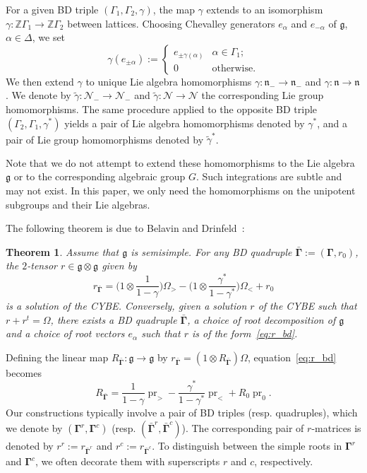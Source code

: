 \documentclass[11pt]{article}
\newcommand{\bbg}{\bar{\mathbf{\Gamma}}}
\newcommand{\bg}{\mathbf{\Gamma}}
\DeclareMathOperator{\pr}{pr}
\newtheorem{theorem}{Theorem}[section]
\theoremstyle{definition}\newtheorem{definition}[theorem]{Definition}
\theoremstyle{definition}\newtheorem{remark}[theorem]{Remark}
\theoremstyle{remark}
\numberwithin{equation}{section}
\begin{document}
For a given BD triple $(\Gamma_1,\Gamma_2,\gamma)$, the map $\gamma$ extends to an isomorphism $\gamma : \mathbb{Z}\Gamma_1 \rightarrow \mathbb{Z}\Gamma_2$  between lattices. Choosing Chevalley generators $e_{\alpha}$ and $e_{-\alpha}$ of $\mathfrak{g}$, $\alpha \in \Delta$, we set
\begin{equation*}
    \gamma(e_{\pm \alpha}) := \begin{cases}
        e_{\pm \gamma(\alpha)} & \alpha \in \Gamma_1;\\
        0 &\text{otherwise.}
    \end{cases}
\end{equation*}
We then extend $\gamma$ to unique Lie algebra homomorphisms $\gamma : \mathfrak{n}_-\rightarrow \mathfrak{n}_-$ and $\gamma : \mathfrak{n}\rightarrow \mathfrak{n}$. We denote by $\tilde{\gamma}: \mathcal{N}_- \rightarrow \mathcal{N}_-$ and $\tilde{\gamma} : \mathcal{N}\rightarrow \mathcal{N}$ the corresponding Lie group homomorphisms. The same procedure applied to the opposite BD triple $(\Gamma_2,\Gamma_1,\gamma^*)$ yields a pair of Lie algebra homomorphisms denoted by $\gamma^*$, and a pair of Lie group homomorphisms denoted by $\tilde{\gamma}^*$.

Note that we do not attempt to extend these
homomorphisms to the Lie algebra $\mathfrak{g}$
or to the corresponding algebraic group $G$. Such integrations are subtle and may not exist. In this paper, we only need the homomorphisms on the unipotent subgroups and their Lie algebras.

The following theorem is due to Belavin and Drinfeld~\cite{bd}:
\begin{theorem}
    Assume that $\mathfrak{g}$ is semisimple.
    For any BD quadruple $\bbg:=(\bg,r_0)$, the $2$-tensor $r \in \mathfrak{g}\otimes \mathfrak{g}$ given by
    \begin{equation}\label{eq:r_bd}
        r_{\bbg} = \Big(1 \otimes \frac{1}{1-\gamma}\Big)\Omega_{>} - \Big(1\otimes \frac{\gamma^*}{1-\gamma^*}\Big)\Omega_{<} + r_0
    \end{equation}
    is a solution of the CYBE. Conversely, given a solution $r$ of the CYBE such that $r + r^t = \Omega$, there exists a BD quadruple $\bbg$, a choice of root decomposition of $\mathfrak{g}$ and a choice of root vectors $e_{\alpha}$ such that $r$ is of the form~\eqref{eq:r_bd}.
\end{theorem}

Defining the linear map $R_{\bbg} : \mathfrak{g}\rightarrow \mathfrak{g}$ by $r_{\bbg} = (1\otimes R_{\bbg})\Omega$, equation~\eqref{eq:r_bd} becomes
\begin{equation*}
    R_{\bbg} = \frac{1}{1-\gamma}\pr_> - \frac{\gamma^*}{1-\gamma^*}\pr_{<} + R_0\pr_0.
\end{equation*}
Our constructions typically involve a pair of BD triples (resp. quadruples), which we denote by $(\bg^r,\bg^c)$ (resp. $(\bbg^r,\bbg^c)$). The corresponding pair of $r$-matrices is denoted by $r^r:=r_{\bbg^r}$ and $r^c := r_{\bbg^c}$. To distinguish between the simple roots in $\bg^r$ and $\bg^c$, we often decorate them with  superscripts $r$ and $c$, respectively.
\end{document}
